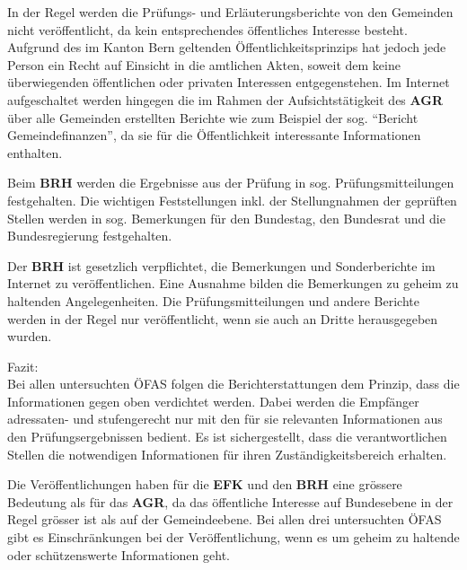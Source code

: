 \documentclass[10pt]{article}
\begin{document}
In der Regel werden die Prüfungs- und Erläuterungsberichte von den Gemeinden nicht veröffentlicht, da kein entsprechendes öffentliches Interesse besteht. Aufgrund des im Kanton Bern geltenden Öffentlichkeitsprinzips hat jedoch jede Person ein Recht auf Einsicht in die amtlichen Akten, soweit dem keine überwiegenden öffentlichen oder privaten Interessen entgegenstehen. Im Internet aufgeschaltet werden hingegen die im Rahmen der Aufsichtstätigkeit des \textbf{AGR} über alle Gemeinden erstellten Berichte wie zum Beispiel der sog. “{}Bericht Gemeindefinanzen”{}, da sie für die Öffentlichkeit interessante Informationen enthalten. 

Beim \textbf{BRH} werden die Ergebnisse aus der Prüfung in sog. Prüfungsmitteilungen festgehalten. Die wichtigen Feststellungen inkl. der Stellungnahmen der geprüften Stellen werden in sog. Bemerkungen für den Bundestag, den Bundesrat und die Bundesregierung festgehalten.

Der \textbf{BRH} ist gesetzlich verpflichtet, die Bemerkungen und Sonderberichte im Internet zu veröffentlichen. Eine Ausnahme bilden die Bemerkungen zu geheim zu haltenden Angelegenheiten. Die Prüfungsmitteilungen und andere Berichte werden in der Regel nur veröffentlicht, wenn sie auch an Dritte herausgegeben wurden.

Fazit:\\
Bei allen untersuchten ÖFAS folgen die Berichterstattungen dem Prinzip, dass die Informationen gegen oben verdichtet werden. Dabei werden die Empfänger adressaten- und stufengerecht nur mit den für sie relevanten Informationen aus den Prüfungsergebnissen bedient. Es ist sichergestellt, dass die verantwortlichen Stellen die notwendigen Informationen für ihren Zuständigkeitsbereich erhalten.

Die Veröffentlichungen haben für die \textbf{EFK} und den \textbf{BRH} eine grössere Bedeutung als für das \textbf{AGR}, da das öffentliche Interesse auf Bundesebene in der Regel grösser ist als auf der Gemeindeebene. Bei allen drei untersuchten ÖFAS gibt es Einschränkungen bei der Veröffentlichung, wenn es um geheim zu haltende oder schützenswerte Informationen geht.
\end{document}
